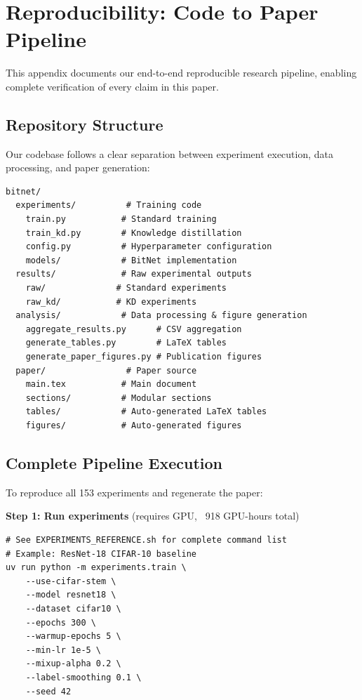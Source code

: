 
\section{Reproducibility: Code to Paper Pipeline}
\label{app:reproducibility}

This appendix documents our end-to-end reproducible research pipeline, enabling complete verification of every claim in this paper.

\subsection{Repository Structure}

Our codebase follows a clear separation between experiment execution, data processing, and paper generation:

\begin{verbatim}
bitnet/
  experiments/          # Training code
    train.py           # Standard training
    train_kd.py        # Knowledge distillation
    config.py          # Hyperparameter configuration
    models/            # BitNet implementation
  results/             # Raw experimental outputs
    raw/              # Standard experiments
    raw_kd/           # KD experiments
  analysis/            # Data processing & figure generation
    aggregate_results.py      # CSV aggregation
    generate_tables.py        # LaTeX tables
    generate_paper_figures.py # Publication figures
  paper/                # Paper source
    main.tex           # Main document
    sections/          # Modular sections
    tables/            # Auto-generated LaTeX tables
    figures/           # Auto-generated figures
\end{verbatim}

\subsection{Complete Pipeline Execution}

To reproduce all 153 experiments and regenerate the paper:

\textbf{Step 1: Run experiments} (requires GPU, ~918 GPU-hours total)
\begin{verbatim}
# See EXPERIMENTS_REFERENCE.sh for complete command list
# Example: ResNet-18 CIFAR-10 baseline
uv run python -m experiments.train \
    --use-cifar-stem \
    --model resnet18 \
    --dataset cifar10 \
    --epochs 300 \
    --warmup-epochs 5 \
    --min-lr 1e-5 \
    --mixup-alpha 0.2 \
    --label-smoothing 0.1 \
    --seed 42
\end{verbatim}

